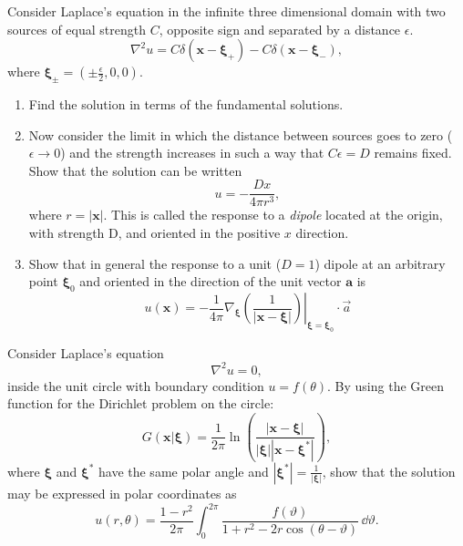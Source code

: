 {\begin{Exercise}
  Consider Laplace's equation in the infinite three dimensional domain 
  with two sources of equal strength $C$, opposite sign and 
  separated by a distance $\epsilon$.  
  \[ 
  \nabla^2 u = C \delta(\mathbf{x} - \boldsymbol{\xi}_+) -  C \delta(\mathbf{x} - \boldsymbol{\xi}_-),
  \]
  where $\boldsymbol{\xi}_{\pm}=(\pm \frac{\epsilon}{2},0,0)$. 
  \begin{enumerate} 
  \item 
    Find the solution in terms of the fundamental solutions. 
  \item 
    Now consider the limit in which the distance between sources 
    goes to zero ($\epsilon \to 0$) and the strength increases in such
    a way that $C \epsilon = D$ remains fixed. Show that the solution can be
    written
    \[ 
    u= - \frac{D x}{4 \pi r^3},
    \]
    where $r = |\mathbf{x}|$. 
    This is called the response to a {\it dipole} located at the origin, with 
    strength D, and oriented in the positive $x$ direction. 
  \item  
    Show that in general the response to a unit ($D = 1$) dipole at an
    arbitrary point $\boldsymbol{\xi}_0$ and oriented in the direction 
    of the unit vector $\mathbf{a}$ is
    \[ 
    u(\mathbf{x}) = - \frac{1}{4 \pi} \nabla_{\boldsymbol{\xi}} \left. 
      \left( \frac{1}{|\mathbf{x} - \boldsymbol{\xi}|} \right) 
    \right|_{\boldsymbol{\xi}=\boldsymbol{\xi}_0} \cdot \vec{a}
    \]
  \end{enumerate}
\end{Exercise}










\begin{Exercise}
  Consider Laplace's equation
  \[ 
  \nabla^2 u = 0,
  \]
  inside the unit circle with boundary condition $u = f(\theta)$. By using
  the Green function for the Dirichlet problem on the circle:
  \[ 
  G(\mathbf{x}|\boldsymbol{\xi}) = \frac{1}{2 \pi} 
  \ln \left( \frac{|\mathbf{x}-\boldsymbol{\xi}|}
    {|\boldsymbol{\xi}| |\mathbf{x} - \boldsymbol{\xi}^*|} \right),
  \]
  where $\boldsymbol{\xi}$ and $\boldsymbol{\xi}^*$ have the same polar angle and 
  $|\boldsymbol{\xi}^*|=\frac{1}{|\boldsymbol{\xi}|}$, show that the
  solution may be expressed in polar coordinates as 
  \[ 
  u(r, \theta) = \frac{1 - r^2}{2 \pi} 
  \int_0^{2 \pi} \frac{ f(\vartheta) }{ 1 + r^2 - 2 r \cos(\theta - \vartheta) } \,\dd \vartheta.
  \]
\end{Exercise}









}
